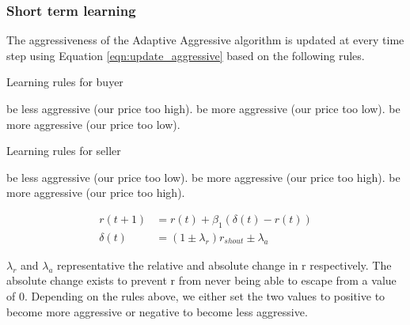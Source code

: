 \documentclass[preprint]{acm_proc_article-sp} %
\begin{document}
\subsubsection{Short term learning} \label{sec:AA_short_term_learning}
The aggressiveness of the Adaptive Aggressive algorithm is updated at every
time step using Equation \ref{eqn:update_aggressive} based on the following rules.

\begin{algorithm}[H]
  \caption{Learning rules for buyer}
  \begin{algorithmic}
            \STATE be less aggressive (our price too high).
        \ELSE
            \STATE be more aggressive (our price too low).
        \ENDIF
        \STATE be more aggressive (our price too low).
    \ENDIF
  \end{algorithmic}
  \label{alg:learning_rules_buyer}
\end{algorithm}

\begin{algorithm}[h]
  \caption{Learning rules for seller}
  \begin{algorithmic}
            \STATE be less aggressive (our price too low).
        \ELSE
            \STATE be more aggressive (our price too high).
        \ENDIF
        \STATE be more aggressive (our price too high).
    \ENDIF
  \end{algorithmic}
  \label{alg:learning_rules_seller}
\end{algorithm}

\begin{equation}
  \begin{aligned}
    r(t+1) &= r(t) + \beta_1(\delta(t) - r(t))\\
    \delta(t) &= (1 \pm \lambda_r)r_{shout} \pm \lambda_a
  \end{aligned}
  \label{eqn:update_aggressive}
\end{equation}

$\lambda_r$ and $\lambda_a$ representative the relative and absolute change in
r respectively. The absolute change exists to prevent r from never being able
to escape from a value of 0. Depending on the rules above, we either set the
two values to positive to become more aggressive or negative to become less
aggressive.
\end{document}
